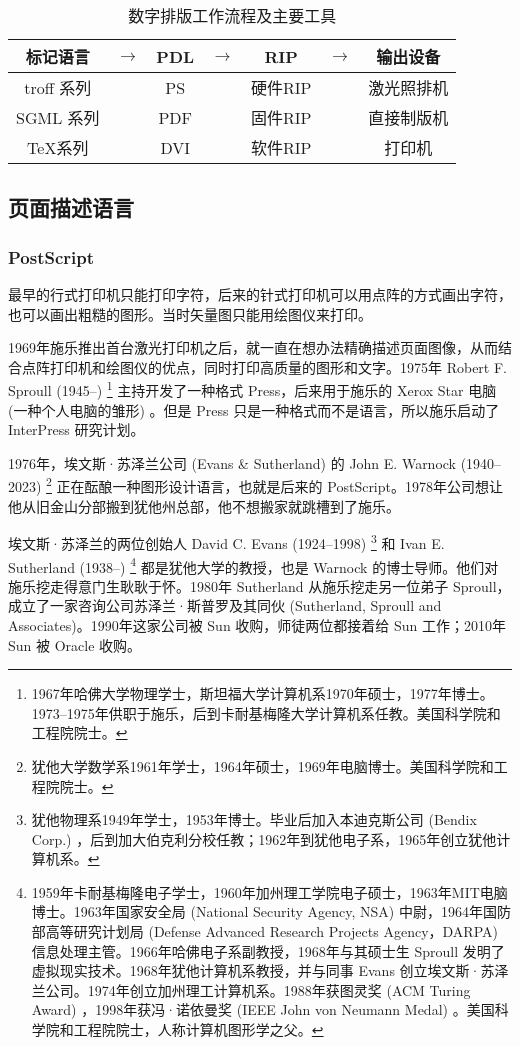 \begin{table}[!htbp]
\centering
\caption{数字排版工作流程及主要工具}
\label{tab:digital_typesetting}
\begin{tabular}{ccccccc}
    \toprule
    标记语言 & $\to$ & PDL & $\to$ & RIP & $\to$ & 输出设备 \\
    \midrule
    troff 系列 & & PS  & & 硬件RIP & & 激光照排机 \\
    SGML 系列  & & PDF & & 固件RIP & & 直接制版机 \\
    \TeX 系列 & & DVI & & 软件RIP & & 打印机 \\
    \bottomrule
\end{tabular}
\end{table}

\subsection{页面描述语言}

\subsubsection{PostScript}
最早的行式打印机只能打印字符，后来的针式打印机可以用点阵的方式画出字符，也可以画出粗糙的图形。当时矢量图只能用绘图仪来打印。

1969年施乐\indexXerox 推出首台激光打印机之后，就一直在想办法精确描述页面图像，从而结合点阵打印机和绘图仪的优点，同时打印高质量的图形和文字。1975年 Robert F. Sproull (1945--)\indexSproull{} \footnote{1967年哈佛大学物理学士，斯坦福大学计算机系1970年硕士，1977年博士。1973--1975年供职于施乐，后到卡耐基梅隆大学计算机系任教。美国科学院和工程院院士。} 主持开发了一种格式 Press，后来用于施乐的 Xerox Star 电脑 (一种个人电脑的雏形) 。但是 Press 只是一种格式而不是语言，所以施乐启动了 InterPress 研究计划。

1976年，埃文斯·苏泽兰公司 (Evans \& Sutherland)\indexEvansSutherland{} 的 John E. Warnock (1940--2023)\indexWarnock{} \footnote{犹他大学数学系1961年学士，1964年硕士，1969年电脑博士。美国科学院和工程院院士。} 正在酝酿一种图形设计语言，也就是后来的 PostScript。1978年公司想让他从旧金山分部搬到犹他州总部，他不想搬家就跳槽到了施乐。

埃文斯·苏泽兰的两位创始人 David C. Evans (1924--1998)\indexEvans{} \footnote{犹他物理系1949年学士，1953年博士。毕业后加入本迪克斯公司 (Bendix Corp.) ，后到加大伯克利分校任教；1962年到犹他电子系，1965年创立犹他计算机系。} 和 Ivan E. Sutherland (1938--)\indexSutherland{} \footnote{1959年卡耐基梅隆电子学士，1960年加州理工学院电子硕士，1963年MIT电脑博士。1963年国家安全局 (National Security Agency, NSA) 中尉，1964年国防部高等研究计划局 (Defense Advanced Research Projects Agency，DARPA) 信息处理主管。1966年哈佛电子系副教授，1968年与其硕士生 Sproull 发明了虚拟现实技术。1968年犹他计算机系教授，并与同事 Evans 创立埃文斯·苏泽兰公司。1974年创立加州理工计算机系。1988年获图灵奖 (ACM Turing Award) ，1998年获冯·诺依曼奖 (IEEE John von Neumann Medal) 。美国科学院和工程院院士，人称计算机图形学之父。} 都是犹他大学的教授，也是 Warnock 的博士导师。他们对施乐挖走得意门生耿耿于怀。1980年 Sutherland 从施乐挖走另一位弟子 Sproull，成立了一家咨询公司苏泽兰·斯普罗及其同伙 (Sutherland, Sproull and Associates)。1990年这家公司被 Sun 收购，师徒两位都接着给 Sun 工作；2010年 Sun 被 Oracle 收购。

